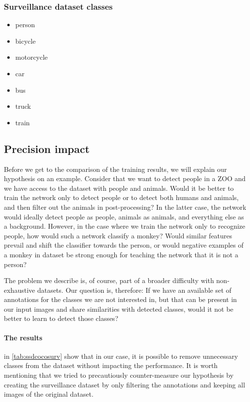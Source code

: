 \subsubsection{Surveillance dataset classes}
\begin{multicols}{2}
    \begin{itemize}
        \item person
        \item bicycle
        \item motorcycle
        \item car
        \item bus
        \item truck
        \item train
    \end{itemize}
\end{multicols}

\subsection{Precision impact}
Before we get to the comparison of the training results, we will explain our hypothesis on an example. Consider that we want to detect people in a ZOO and we have access to the dataset with people and animals. Would it be better to train the network only to detect people or to detect both humans and animals, and then filter out the animals in post-processing? In the latter case, the network would ideally detect people as people, animals as animals, and everything else as a background. However, in the case where we train the network only to recognize people, how would such a network classify a monkey? Would similar features prevail and shift the classifier towards the person, or would negative examples of a monkey in dataset be strong enough for teaching the network that it is not a person? 

The problem we describe is, of course, part of a broader difficulty with non-exhaustive datasets. Our question is, therefore: If we have an available set of annotations for the classes we are not interested in, but that can be present in our input images and share similarities with detected classes, would it not be better to learn to detect those classes?

\paragraph{The results} in \cref{tab:ssdcocosurv} show that in our case, it is possible to remove unnecessary classes from the dataset without impacting the performance. It is worth mentioning that we tried to precautiously counter-measure our hypothesis by creating the surveillance dataset by only filtering the annotations and keeping all images of the original dataset.

